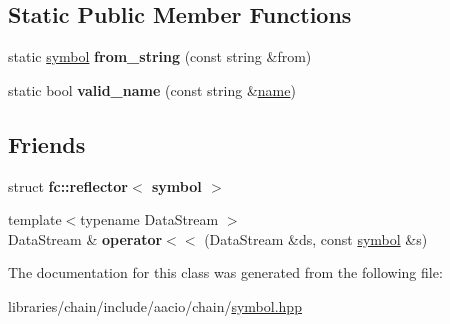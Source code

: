 \subsection*{Static Public Member Functions}
\begin{DoxyCompactItemize}
\item 
\mbox{\label{classaacio_1_1chain_1_1symbol_a59b672f305fd60139763559d2d7c8ff7}} 
static \mbox{\hyperlink{classaacio_1_1chain_1_1symbol}{symbol}} {\bfseries from\+\_\+string} (const string \&from)
\item 
\mbox{\label{classaacio_1_1chain_1_1symbol_a9e0734f531db01d4629ee9b997d3dfa7}} 
static bool {\bfseries valid\+\_\+name} (const string \&\mbox{\hyperlink{structaacio_1_1chain_1_1name}{name}})
\end{DoxyCompactItemize}
\subsection*{Friends}
\begin{DoxyCompactItemize}
\item 
\mbox{\label{classaacio_1_1chain_1_1symbol_a36b73077fa87f97f8fcef51f9a3fa1b5}} 
struct {\bfseries fc\+::reflector$<$ symbol $>$}
\item 
\mbox{\label{classaacio_1_1chain_1_1symbol_a8425be1ea7ea0357a6c90708ad556290}} 
{\footnotesize template$<$typename Data\+Stream $>$ }\\Data\+Stream \& {\bfseries operator$<$$<$} (Data\+Stream \&ds, const \mbox{\hyperlink{classaacio_1_1chain_1_1symbol}{symbol}} \&s)
\end{DoxyCompactItemize}


The documentation for this class was generated from the following file\+:\begin{DoxyCompactItemize}
\item 
libraries/chain/include/aacio/chain/\mbox{\hyperlink{symbol_8hpp}{symbol.\+hpp}}\end{DoxyCompactItemize}
